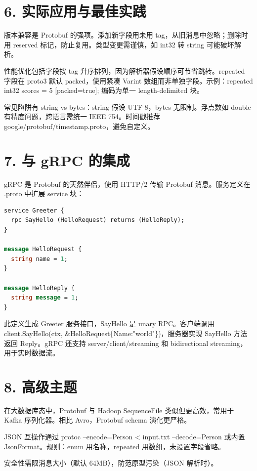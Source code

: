 \chapter{6. 实际应用与最佳实践}
版本兼容是 Protobuf 的强项。添加新字段用未用 tag，从旧消息中忽略；删除时用 reserved 标记，防止复用。类型变更需谨慎，如 int32 转 string 可能破坏解析。\par
性能优化包括字段按 tag 升序排列，因为解析器假设顺序可节省跳转。repeated 字段在 proto3 默认 packed，使用紧凑 Varint 数组而非单独字段。示例：repeated int32 scores = 5 [packed=true]; 编码为单一 length-delimited 块。\par
常见陷阱有 string vs bytes：string 假设 UTF-8，bytes 无限制。浮点数如 double 有精度问题，跨语言需统一 IEEE 754。时间戳推荐 google/protobuf/timestamp.proto，避免自定义。\par
\chapter{7. 与 gRPC 的集成}
gRPC 是 Protobuf 的天然伴侣，使用 HTTP/2 传输 Protobuf 消息。服务定义在 .proto 中扩展 service 块：\par
\begin{lstlisting}[language=proto]
service Greeter {
  rpc SayHello (HelloRequest) returns (HelloReply);
}

message HelloRequest {
  string name = 1;
}

message HelloReply {
  string message = 1;
}
\end{lstlisting}
此定义生成 Greeter 服务接口，SayHello 是 unary RPC。客户端调用 client.SayHello(ctx, \&{}HelloRequest\{{}Name:"world"\}{})，服务器实现 SayHello 方法返回 Reply。gRPC 还支持 server/client/streaming 和 bidirectional streaming，用于实时数据流。\par
\chapter{8. 高级主题}
在大数据库态中，Protobuf 与 Hadoop SequenceFile 类似但更高效，常用于 Kafka 序列化器。相比 Avro，Protobuf schema 演化更严格。\par
JSON 互操作通过 protoc --encode=Person < input.txt --decode=Person 或内置 JsonFormat。规则：enum 用名称，repeated 用数组，未设置字段省略。\par
安全性需限消息大小（默认 64MB），防范原型污染（JSON 解析时）。\par

